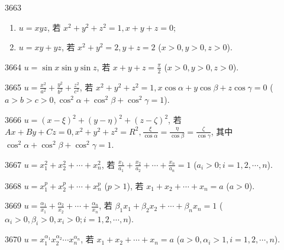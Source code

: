 \begin{prob}[M]{3663}
\begin{enumerate}[label=(\alph*), itemsep=2pt, topsep=3pt]
\item $u = xyz$, 若 $x^2 + y^2 + z^2 = 1, x + y + z = 0$;
\item $u = xy + yz$, 若 $x^2 + y^2 = 2, y + z = 2$ ($x > 0, y > 0, z > 0$).
\end{enumerate}
\end{prob}

\begin{prob}[S]{3664}
$u = \sin x \sin y \sin z$, 若 $x + y + z = \frac{\pi}{2}$ ($x > 0, y > 0, z > 0$).
\end{prob}

\begin{prob}[M]{3665}
$u = \frac{x^2}{a^2} + \frac{y^2}{b^2} + \frac{z^2}{c^2}$, 若 $x^2 + y^2 + z^2 = 1, x\cos\alpha + y\cos\beta + z\cos\gamma = 0$ ($a > b > c > 0, \cos^2\alpha + \cos^2\beta + \cos^2\gamma = 1$).
\end{prob}

\begin{prob}[M]{3666}
$u = (x - \xi)^2 + (y - \eta)^2 + (z - \zeta)^2$, 若 $Ax + By + Cz = 0, x^2 + y^2 + z^2 = R^2, \frac{\xi}{\cos\alpha} = \frac{\eta}{\cos\beta} = \frac{\zeta}{\cos\gamma}$, 其中 $\cos^2\alpha + \cos^2\beta + \cos^2\gamma = 1$.
\end{prob}

\begin{prob}[S]{3667}
$u = x_1^2 + x_2^2 + \cdots + x_n^2$, 若 $\frac{x_1}{a_1} + \frac{x_2}{a_2} + \cdots + \frac{x_n}{a_n} = 1$ ($a_i > 0; i = 1, 2, \cdots, n$).
\end{prob}

\begin{prob}[S]{3668}
$u = x_1^p + x_2^p + \cdots + x_n^p$ ($p > 1$), 若 $x_1 + x_2 + \cdots + x_n = a$ ($a > 0$).
\end{prob}

\begin{prob}[M]{3669}
$u = \frac{\alpha_1}{x_1} + \frac{\alpha_2}{x_2} + \cdots + \frac{\alpha_n}{x_n}$, 若 $\beta_1 x_1 + \beta_2 x_2 + \cdots + \beta_n x_n = 1$ ($\alpha_i > 0, \beta_i > 0, x_i > 0; i = 1, 2, \cdots, n$).
\end{prob}

\begin{prob}[S]{3670}
$u = x_1^{\alpha_1} x_2^{\alpha_2} \cdots x_n^{\alpha_n}$, 若 $x_1 + x_2 + \cdots + x_n = a$ ($a > 0, \alpha_i > 1, i = 1, 2, \cdots, n$).
\end{prob}

